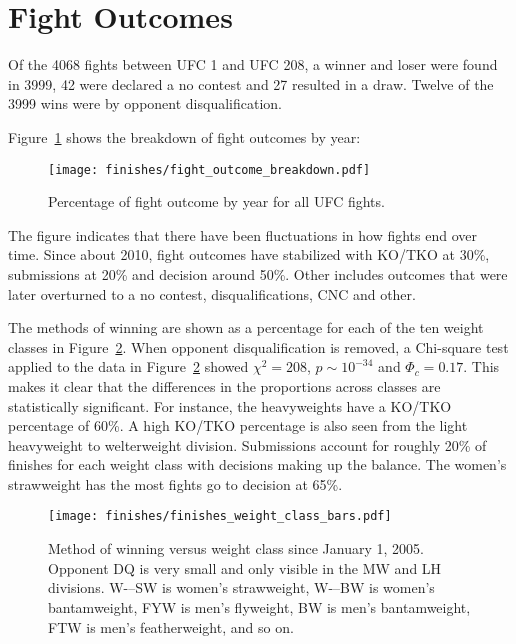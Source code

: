 \clearpage
\section{Fight Outcomes}

Of the 4068 fights between UFC 1 and UFC 208,
a winner and loser were found in 3999,
42 were declared a no contest and 27 resulted in a draw.
Twelve of the 3999 wins were by opponent disqualification.

Figure~\ref{fight_outcome_by_year} shows the breakdown of fight
outcomes by year:

\begin{figure}[h]
\begin{center}
\texttt{[image: finishes/fight\_outcome\_breakdown.pdf]}
\caption{Percentage of fight outcome by year for all UFC fights.}
\label{fight_outcome_by_year}
\end{center}
\end{figure}

The figure indicates that there have been fluctuations in how
fights end over time. Since about 2010, fight outcomes have
stabilized with KO/TKO at 30\%, submissions at 20\% and decision
around 50\%.
Other includes outcomes that were later overturned to a no contest,
disqualifications, CNC and other.

The methods of winning are shown as a percentage for each
of the ten weight classes in Figure~\ref{finishes_weight_class_bars}.
When opponent disqualification is removed, a Chi-square test
applied to the data in Figure~\ref{finishes_weight_class_bars}
showed $\chi^2=208$, $p \sim 10^{-34}$ and $\Phi_c=0.17$. This makes it
clear that the differences in the proportions across classes are
statistically significant.
For instance, the heavyweights have a KO/TKO percentage of 60\%.
A high KO/TKO percentage is also seen from the light heavyweight
to welterweight division.
Submissions account for roughly 20\% of finishes for each weight class with
decisions making up the balance. The women's strawweight has the
most fights go to decision at 65\%.

\begin{figure}[h]
\begin{center}
\texttt{[image: finishes/finishes\_weight\_class\_bars.pdf]}
\caption{Method of winning versus weight class since January 1, 2005.
Opponent DQ is very small and only visible in the MW and LH divisions.
W-–SW is women's strawweight, W-–BW is women's bantamweight, FYW is
men's flyweight, BW is men's bantamweight, FTW is men's
featherweight, and so on.}
\label{finishes_weight_class_bars}
\end{center}
\end{figure}

